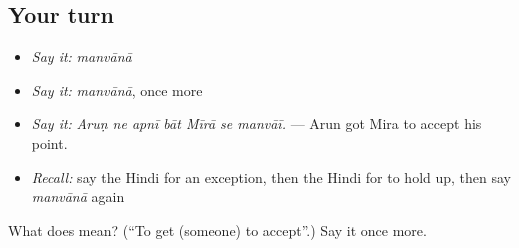 \subsection*{Your turn}
\begin{itemize}
\raggedright
  \item \emph{Say it:} \emph{manvānā}
  \item \emph{Say it:} \emph{manvānā}, once more
  \item \emph{Say it:} \emph{Aruṇ ne apnī bāt Mīrā se manvāī.} — Arun got Mira to accept his point.
  \item \emph{Recall:} say the Hindi for an exception, then the Hindi for to hold up, then say \emph{manvānā} again
\end{itemize}

\begin{tcolorbox}[breakable,colback=teal!4,colframe=teal!35!black,title={Before you move on}]
What does  mean? (\textquotedblleft{}To get (someone) to accept\textquotedblright{}.) Say it once more.
\end{tcolorbox}
